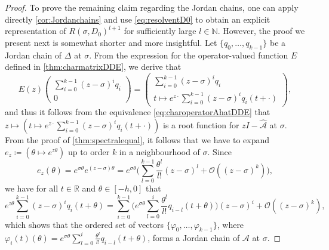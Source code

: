\documentclass[english]{myarticle}
\begin{document}
\begin{sloppypar}
\begin{proof}
To prove the remaining claim regarding the Jordan chains, one can apply directly \cref{cor:Jordanchains} and use \eqref{eq:resolventD0} to obtain an explicit representation of $R(\sigma,D_0)^{l+1}$ for sufficiently large $l \in \mathbb{N}$. However, the proof we present next is somewhat shorter and more insightful. Let $\{{q}_{0},\dots,{q}_{k-1} \}$ be a Jordan chain of $\Delta$ at $\sigma$. From the expression for the operator-valued function $E$ defined in \cref{thm:charmatrixDDE}, we derive that
\begin{equation*}
E(z)
    \begin{pmatrix}
        \sum_{i=0}^{k-1} (z-\sigma)^{i} q_i \\
        0
    \end{pmatrix}
    =
    \begin{pmatrix}
        \sum_{i=0}^{k-1} (z-\sigma)^{i} q_i \\
        t \mapsto e^{z \cdot} \sum_{i=0}^{k-1} (z-\sigma)^i q_i(t+\cdot)
    \end{pmatrix}, 
\end{equation*}
and thus it follows from the equivalence \eqref{eq:charoperatorAhatDDE} that $z \mapsto (t \mapsto e^{z \cdot} \sum_{i=0}^{k-1} (z-\sigma)^i q_i(t+\cdot))$ is a root function for $zI - \hat{\mathcal{A}}$ at $\sigma$. From the proof of \cref{thm:spectralequal}, it follows that we have to expand $e_z \coloneqq (\theta \mapsto e^{z \theta})$ up to order $k$ in a neighbourhood of $\sigma$. Since
\begin{equation*}
    e_z(\theta) = e^{\sigma \theta} e^{(z-\sigma)\theta} = e^{\sigma \theta} \bigg( \sum_{l=0}^{k-1} \frac{\theta^{l}}{l!}(z-\sigma)^l + \mathcal{O}((z-\sigma)^k) \bigg),
\end{equation*}
we have for all $t \in \mathbb{R}$ and $\theta \in [-h,0]$ that 
\begin{equation*}
    e^{z \theta} \sum_{i=0}^{k-1} (z-\sigma)^i q_i(t+\theta) = \sum_{i=0}^{k-1} \bigg( e^{\sigma \theta} \sum_{l=0}^i \frac{\theta^l}{l!}q_{i-l}(t+\theta) \bigg) (z-\sigma)^i + \mathcal{O}((z-\sigma)^k),
\end{equation*}
which shows that the ordered set of vectors $\{\varphi_0,\dots,\varphi_{k-1} \}$, where $\varphi_i(t)(\theta) = e^{\sigma \theta} \sum_{l=0}^i \frac{\theta^l}{l!}q_{i-l}(t+\theta)$, forms a Jordan chain of $\mathcal{A}$ at $\sigma$.
\end{proof}


\end{sloppypar}
\end{document}
